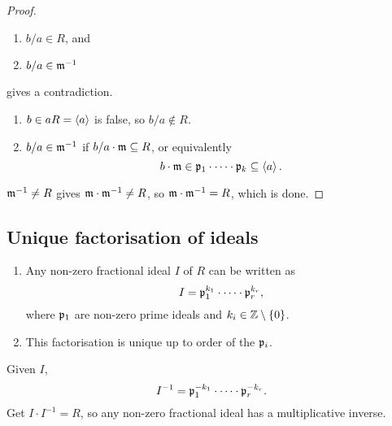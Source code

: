 \begin{proof}
\begin{enumerate}
\item $ b / a \in R $, and
\item $ b / a \in \mathfrak{m}^{-1} $
\end{enumerate}
gives a contradiction.
\begin{enumerate}
\item $ b \in aR = \left\langle a \right\rangle $ is false, so $ b / a \notin R $.
\item $ b / a \in \mathfrak{m}^{-1} $ if $ b / a \cdot \mathfrak{m} \subseteq R $, or equivalently
$$ b \cdot \mathfrak{m} \in \mathfrak{p}_1 \cdot \dots \cdot \mathfrak{p}_k \subseteq \left\langle a \right\rangle. $$
\end{enumerate}
$ \mathfrak{m}^{-1} \ne R $ gives $ \mathfrak{m} \cdot \mathfrak{m}^{-1} \ne R $, so $ \mathfrak{m} \cdot \mathfrak{m}^{-1} = R $, which is done.
\end{proof}

\pagebreak

\subsection{Unique factorisation of ideals}

\begin{theorem}
\label{thm:uniquefactorisationofideals}
\hfill
\begin{enumerate}
\item Any non-zero fractional ideal $ I $ of $ R $ can be written as
$$ I = \mathfrak{p}_1^{k_1} \cdot \dots \cdot \mathfrak{p}_r^{k_r}, $$
where $ \mathfrak{p}_1 $ are non-zero prime ideals and $ k_i \in \mathbb{Z} \setminus \left\{ 0 \right\} $.
\item This factorisation is unique up to order of the $ \mathfrak{p}_i $.
\end{enumerate}
\end{theorem}

\begin{remark*}
Given $ I $,
$$ I^{-1} = \mathfrak{p}_1^{-k_1} \cdot \dots \cdot \mathfrak{p}_r^{-k_r}. $$
Get $ I \cdot I^{-1} = R $, so any non-zero fractional ideal has a multiplicative inverse.
\end{remark*}

